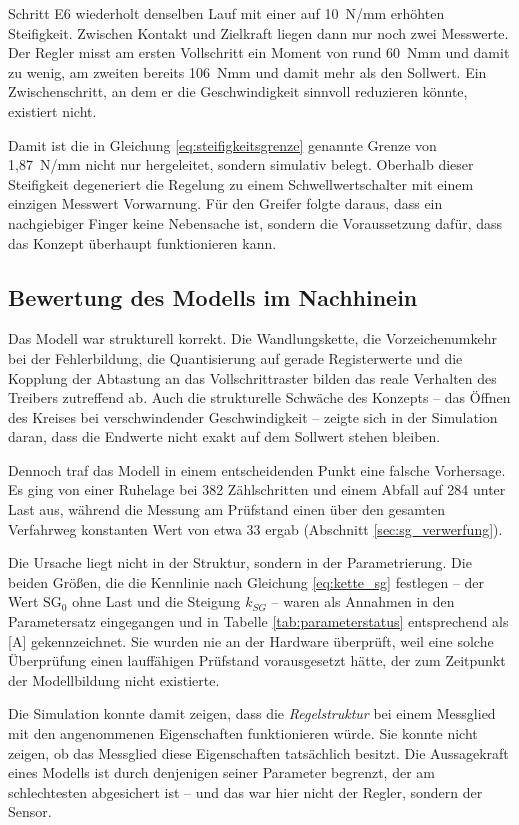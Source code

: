 Schritt E6 wiederholt denselben Lauf mit einer auf 10~N/mm erhöhten Steifigkeit.
Zwischen Kontakt und Zielkraft liegen dann nur noch zwei Messwerte. Der Regler misst am
ersten Vollschritt ein Moment von rund 60~Nmm und damit zu wenig, am zweiten bereits
106~Nmm und damit mehr als den Sollwert. Ein Zwischenschritt, an dem er die Geschwindigkeit
sinnvoll reduzieren könnte, existiert nicht.

Damit ist die in Gleichung \ref{eq:steifigkeitsgrenze} genannte Grenze von 1,87~N/mm nicht
nur hergeleitet, sondern simulativ belegt. Oberhalb dieser Steifigkeit degeneriert die
Regelung zu einem Schwellwertschalter mit einem einzigen Messwert Vorwarnung. Für den
Greifer folgte daraus, dass ein nachgiebiger Finger keine Nebensache ist, sondern die
Voraussetzung dafür, dass das Konzept überhaupt funktionieren kann.

\subsection*{Bewertung des Modells im Nachhinein}

Das Modell war strukturell korrekt. Die Wandlungskette, die Vorzeichenumkehr bei der
Fehlerbildung, die Quantisierung auf gerade Registerwerte und die Kopplung der Abtastung
an das Vollschrittraster bilden das reale Verhalten des Treibers zutreffend ab. Auch die
strukturelle Schwäche des Konzepts -- das Öffnen des Kreises bei verschwindender
Geschwindigkeit -- zeigte sich in der Simulation daran, dass die Endwerte nicht exakt auf
dem Sollwert stehen bleiben.

Dennoch traf das Modell in einem entscheidenden Punkt eine falsche Vorhersage. Es ging
von einer Ruhelage bei 382 Zählschritten und einem Abfall auf 284 unter Last aus,
während die Messung am Prüfstand einen über den gesamten Verfahrweg konstanten Wert von
etwa 33 ergab (Abschnitt \ref{sec:sg_verwerfung}).

Die Ursache liegt nicht in der Struktur, sondern in der Parametrierung. Die beiden Größen,
die die Kennlinie nach Gleichung \ref{eq:kette_sg} festlegen -- der Wert $\mathrm{SG_0}$
ohne Last und die Steigung $k_{SG}$ -- waren als Annahmen in den Parametersatz eingegangen
und in Tabelle \ref{tab:parameterstatus} entsprechend als [A] gekennzeichnet. Sie wurden
nie an der Hardware überprüft, weil eine solche Überprüfung einen lauffähigen Prüfstand
vorausgesetzt hätte, der zum Zeitpunkt der Modellbildung nicht existierte.

Die Simulation konnte damit zeigen, dass die \emph{Regelstruktur} bei einem Messglied mit
den angenommenen Eigenschaften funktionieren würde. Sie konnte nicht zeigen, ob das
Messglied diese Eigenschaften tatsächlich besitzt. Die Aussagekraft eines Modells ist
durch denjenigen seiner Parameter begrenzt, der am schlechtesten abgesichert ist -- und
das war hier nicht der Regler, sondern der Sensor.

